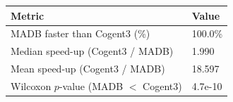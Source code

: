 \begin{tabular}{lp{8cm}}
\toprule
Metric & Value \\
\midrule
MADB faster than Cogent3 (\%) & 100.0\% \\
Median speed-up (Cogent3 / MADB) & 1.990 \\
Mean speed-up (Cogent3 / MADB) & 18.597 \\
Wilcoxon $p$-value (MADB $<$ Cogent3) & 4.7e-10 \\
\bottomrule
\end{tabular}
